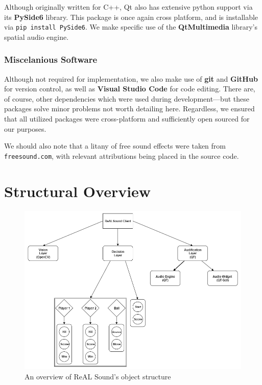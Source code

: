 \documentclass{report}
\newcommand{\rs}{ReAL Sound\xspace}
\newcommand{\tech}[1]{\textbf{#1}}
\begin{document}
Although originally written for C++, Qt also has extensive python support via its \tech{PySide6} library. This package is once again cross platform, and is installable via \texttt{pip install PySide6}. We make specific use of the \tech{QtMultimedia} library's spatial audio engine.

\subsubsection{Miscelanious Software}
Although not required for implementation, we also make use of \tech{git} and \tech{GitHub} for version control, as well as \tech{Visual Studio Code} for code editing. There are, of course, other dependencies which were used during development---but these packages solve minor problems not worth detailing here. Regardless, we ensured that all utilized packages were cross-platform and sufficiently open sourced for our purposes. 

We should also note that a litany of free sound effects were taken from \texttt{freesound.com}, with relevant attributions being placed in the source code.

\section{Structural Overview }

\begin{figure}[h]
    \includegraphics[width=\textwidth]{deps.png}
    \caption{An overview of \rs's object structure}
    \label{fig:deps}
\end{figure}
\end{document}
